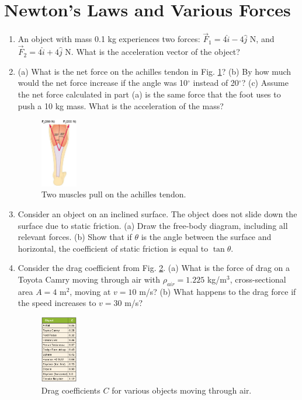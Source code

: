\documentclass[10pt]{article}
\begin{document}
\section{Newton's Laws and Various Forces}
\begin{enumerate}
\item An object with mass 0.1 kg experiences two forces: $\vec{F}_1 = 4\hat{i}-4\hat{j}$ N, and $\vec{F}_2 = 4\hat{i}+4\hat{j}$ N.  What is the acceleration vector of the object? \\ \vspace{1cm}
\item (a) What is the net force on the achilles tendon in Fig. \ref{fig:tendon}? (b) By how much would the net force increase if the angle was 10$^{\circ}$ instead of 20$^{\circ}$? (c) Assume the net force calculated in part (a) is the same force that the foot uses to push a 10 kg mass.  What is the acceleration of the mass? \\ \vspace{2cm}
\begin{figure}[hb]
\centering
\includegraphics[width=0.15\textwidth]{figures/tendon.png}
\caption{\label{fig:tendon} Two muscles pull on the achilles tendon.}
\end{figure}
\item Consider an object on an inclined surface.  The object does not slide down the surface due to static friction. (a) Draw the free-body diagram, including all relevant forces.  (b) Show that if $\theta$ is the angle between the surface and horizontal, the coefficient of static friction is equal to $\tan\theta$. \\ \vspace{3cm}
\item Consider the drag coefficient from Fig. \ref{fig:drag}. (a) What is the force of drag on a Toyota Camry moving through air with $\rho_{air} = 1.225$ kg/m$^3$, cross-sectional area $A=4$ m$^2$, moving at $v=10$ m/s? (b) What happens to the drag force if the speed increases to $v=30$ m/s? \\ \vspace{2cm}
\begin{figure}
\centering
\includegraphics[width=0.15\textwidth]{figures/drag_table.png}
\caption{\label{fig:drag} Drag coefficients $C$ for various objects moving through air.}
\end{figure}
\end{enumerate}
\end{document}
